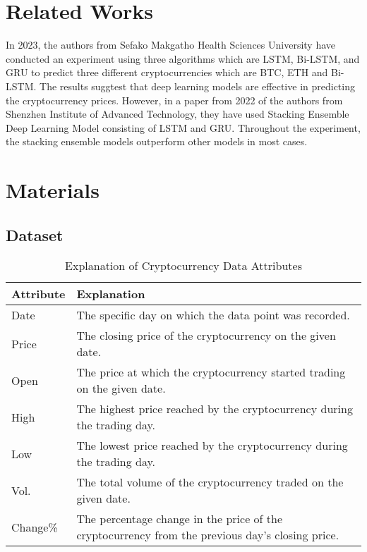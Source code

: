 \documentclass{ieeeojies}
\begin{document}
\section{Related Works}
In 2023, the authors \cite{seabe2023forecasting} from Sefako Makgatho Health Sciences University have conducted an experiment using three algorithms which are LSTM, Bi-LSTM, and GRU to predict three different cryptocurrencies which are BTC, ETH and Bi-LSTM. The results suggtest that deep learning models are effective in predicting the cryptocurrency prices. However, in a paper from 2022 of the authors \cite{ye2022stacking} from Shenzhen Institute of Advanced Technology, they have used Stacking Ensemble Deep Learning Model consisting of LSTM and GRU. Throughout the experiment, the stacking ensemble models outperform other models in most cases.


\section{Materials}

\subsection{Dataset}
\begin{table}[h]
\centering
\begin{tabular}{|p{3cm}|p{4cm}|}
\hline
\textbf{Attribute} & \textbf{Explanation} \\ \hline
Date & The specific day on which the data point was recorded. \\ \hline
Price & The closing price of the cryptocurrency on the given date. \\ \hline
Open & The price at which the cryptocurrency started trading on the given date. \\ \hline
High & The highest price reached by the cryptocurrency during the trading day. \\ \hline
Low & The lowest price reached by the cryptocurrency during the trading day. \\ \hline
Vol. & The total volume of the cryptocurrency traded on the given date. \\ \hline
Change\% & The percentage change in the price of the cryptocurrency from the previous day's closing price. \\ \hline
\end{tabular}
\caption{Explanation of Cryptocurrency Data Attributes}
\label{table:crypto_attributes}
\end{table}
\end{document}
